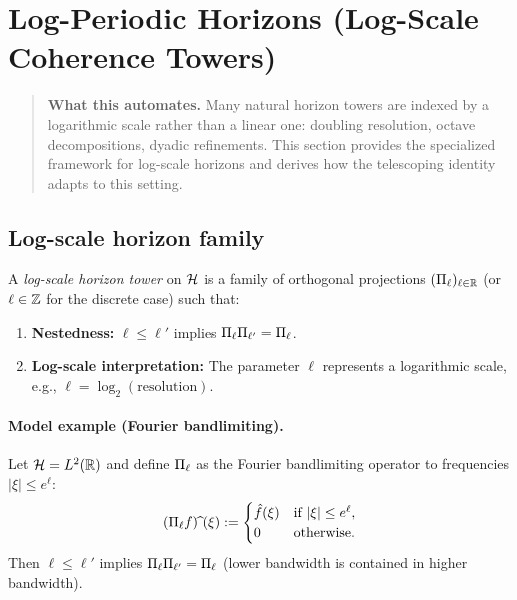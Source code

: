 \section{Log-Periodic Horizons (Log-Scale Coherence Towers)}
\label{sec:log-periodic}

\begin{quote}\small
\textbf{What this automates.}
Many natural horizon towers are indexed by a logarithmic scale rather than a linear one: doubling resolution, octave decompositions, dyadic refinements.
This section provides the specialized framework for log-scale horizons and derives how the telescoping identity adapts to this setting.
\end{quote}

\subsection{Log-scale horizon family}

\begin{definition}
\label{def:log-horizon}
A \emph{log-scale horizon tower} on $\mathcal{H}$ is a family of orthogonal projections $(\Pi_{\ell})_{\ell \in \mathbb{R}}$ (or $\ell \in \mathbb{Z}$ for the discrete case) such that:
\begin{enumerate}[label=(\roman*)]
\item \textbf{Nestedness:} $\ell \le \ell'$ implies $\Pi_{\ell} \Pi_{\ell'} = \Pi_{\ell}$.
\item \textbf{Log-scale interpretation:} The parameter $\ell$ represents a logarithmic scale, e.g., $\ell = \log_2(\text{resolution})$.
\end{enumerate}
\end{definition}

\paragraph{Model example (Fourier bandlimiting).}
\label{ex:fourier-bandlimit}
Let $\mathcal{H} = L^2(\mathbb{R})$ and define $\Pi_{\ell}$ as the Fourier bandlimiting operator to frequencies $|\xi| \le e^\ell$:
\[
(\Pi_{\ell} f)\,\widehat{}\,(\xi) :=
\begin{cases}
\hat f(\xi) & \text{if } |\xi| \le e^\ell, \\
0 & \text{otherwise}.
\end{cases}
\]
Then $\ell \le \ell'$ implies $\Pi_{\ell} \Pi_{\ell'} = \Pi_{\ell}$ (lower bandwidth is contained in higher bandwidth).

